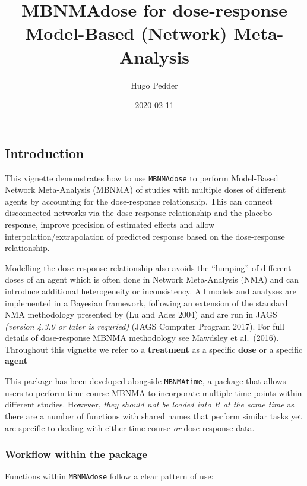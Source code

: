 \documentclass[]{article}
\title{MBNMAdose for dose-response Model-Based (Network) Meta-Analysis}
\author{Hugo Pedder}
\date{2020-02-11}
\begin{document}
\maketitle

{
\setcounter{tocdepth}{2}
\tableofcontents
}
\hypertarget{introduction}{%
\subsection{Introduction}\label{introduction}}

This vignette demonstrates how to use \texttt{MBNMAdose} to perform
Model-Based Network Meta-Analysis (MBNMA) of studies with multiple doses
of different agents by accounting for the dose-response relationship.
This can connect disconnected networks via the dose-response
relationship and the placebo response, improve precision of estimated
effects and allow interpolation/extrapolation of predicted response
based on the dose-response relationship.

Modelling the dose-response relationship also avoids the ``lumping'' of
different doses of an agent which is often done in Network Meta-Analysis
(NMA) and can introduce additional heterogeneity or inconsistency. All
models and analyses are implemented in a Bayesian framework, following
an extension of the standard NMA methodology presented by (Lu and Ades
2004) and are run in JAGS \emph{(version 4.3.0 or later is requried)}
(JAGS Computer Program 2017). For full details of dose-response MBNMA
methodology see Mawdsley et al.~(2016). Throughout this vignette we
refer to a \textbf{treatment} as a specific \textbf{dose} or a specific
\textbf{agent}

This package has been developed alongside \texttt{MBNMAtime}, a package
that allows users to perform time-course MBNMA to incorporate multiple
time points within different studies. However, \emph{they should not be
loaded into R at the same time} as there are a number of functions with
shared names that perform similar tasks yet are specific to dealing with
either time-course \emph{or} dose-response data.

\hypertarget{workflow-within-the-package}{%
\subsubsection{Workflow within the
package}\label{workflow-within-the-package}}

Functions within \texttt{MBNMAdose} follow a clear pattern of use:
\end{document}
